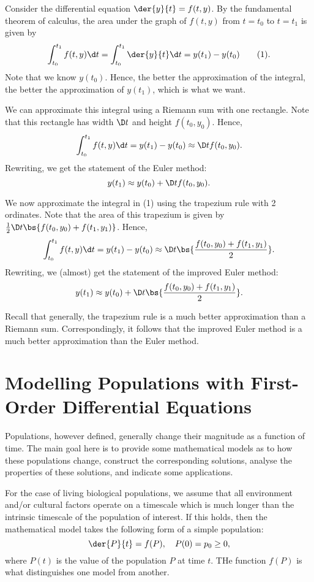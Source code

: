 Consider the differential equation $\der{y}{t} = f(t, y)$. By the fundamental theorem of calculus, the area under the graph of $f(t, y)$ from $t = t_0$ to $t = t_1$ is given by \[\int_{t_0}^{t_1} f(t, y) \d t = \int_{t_0}^{t_1} \der{y}{t} \d t = y(t_1) - y(t_0) \tag{1}.\] Note that we know $y(t_0)$. Hence, the better the approximation of the integral, the better the approximation of $y(t_1)$, which is what we want.

We can approximate this integral using a Riemann sum with one rectangle. Note that this rectangle has width $\D t$ and height $f(t_0, y_0)$. Hence, \[\int_{t_0}^{t_1} f(t, y) \d t = y(t_1) - y(t_0) \approx \D t f(t_0, y_0).\] Rewriting, we get the statement of the Euler method: \[y(t_1) \approx y(t_0) + \D t f(t_0, y_0).\]

We now approximate the integral in (1) using the trapezium rule with 2 ordinates. Note that the area of this trapezium is given by $\frac12 \D t \bs{f(t_0, y_0) + f(t_1, y_1)}$. Hence, \[\int_{t_0}^{t_1} f(t, y) \d t = y(t_1) - y(t_0) \approx \D t \bs{\frac{f(t_0, y_0) +f(t_1, y_1)}{2}}.\] Rewriting, we (almost) get the statement of the improved Euler method: \[y(t_1) \approx y(t_0) + \D t \bs{\frac{f(t_0, y_0) +f(t_1, y_1)}{2}}.\]

Recall that generally, the trapezium rule is a much better approximation than a Riemann sum. Correspondingly, it follows that the improved Euler method is a much better approximation than the Euler method.

\section{Modelling Populations with First-Order Differential Equations}

Populations, however defined, generally change their magnitude as a function of time. The main goal here is to provide some mathematical models as to how these populations change, construct the corresponding solutions, analyse the properties of these solutions, and indicate some applications.

For the case of living biological populations, we assume that all environment and/or cultural factors operate on a timescale which is much longer than the intrinsic timescale of the population of interest. If this holds, then the mathematical model takes the following form of a simple population: \[\der{P}{t} = f(P), \quad P(0) = p_0 \geq 0,\] where $P(t)$ is the value of the population $P$ at time $t$. THe function $f(P)$ is what distinguishes one model from another.

